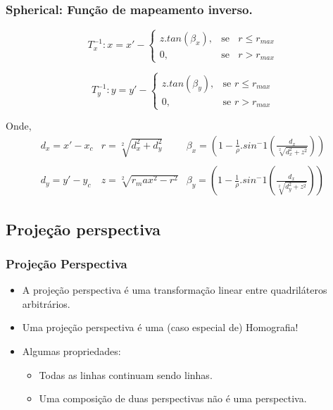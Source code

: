 \documentclass{beamer}
\begin{document}
\begin{frame}
 \frametitle{Spherical: Função de mapeamento inverso.}
  \begin{equation}
    T_x^{-1}: x = x' -
\begin{cases}
 z.tan(\beta_x), & \text{se }\;\; r \leq r_{max}\\
 0, & \text{se }\;\; r > r_{max}
\end{cases}
   \end{equation}

\begin{equation}
    T_y^{-1}: y = y' - 
\begin{cases}
 z.tan(\beta_y), & \text{se } r \leq r_{max} \\
 0, & \text{se } r > r_{max}
\end{cases}
\end{equation}

Onde,
\begin{equation}
\begin{array}{c|c|c}
d_x = x'- x_c & r = \sqrt[2]{d_x^2+d_y^2}  & \beta_x =
(1-\frac{1}{\rho}.sin^-1(\frac{d_x}{\sqrt[2]{d_x^2+z^2}}))\\
 & & \\
d_y =  y'- y_c & z = \sqrt[2]{r_max^2 - r^2} & \beta_y = 
(1-\frac{1}{\rho}.sin^-1(\frac{d_x}{\sqrt[2]{d_y^2+z^2}}))
\end{array}
\end{equation}
\end{frame}

\subsection{Projeção perspectiva}
\begin{frame}
 \frametitle{Projeção Perspectiva}
 \begin{itemize}
  \item A projeção perspectiva é uma transformação linear entre quadriláteros
arbitrários.
  \item Uma projeção perspectiva é uma (caso especial de) Homografia!
  \item Algumas propriedades:
  \begin{itemize}
   \item Todas as linhas continuam sendo linhas.
   \item Uma composição de duas perspectivas não é uma perspectiva.
  \end{itemize}
 \end{itemize}
\begin{center}
\end{center}
\end{frame}
\end{document}
